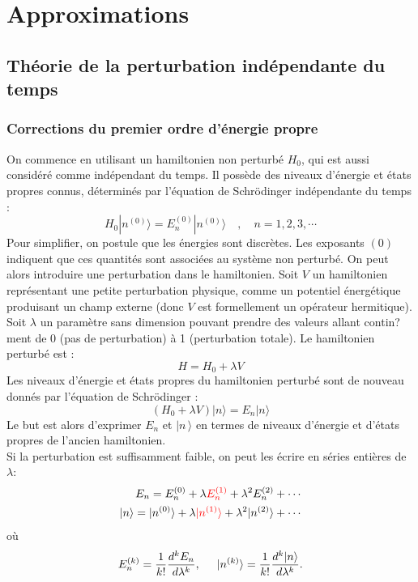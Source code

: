 \documentclass{article}
\begin{document}
\section{Approximations}
\subsection{Th\'eorie de la perturbation ind\'ependante du temps}
\subsubsection{Corrections du premier ordre d'\'energie propre}
On commence en utilisant un hamiltonien non perturb\'e $\scriptstyle H_0$, qui est aussi consid\'er\'e comme ind\'ependant du temps. Il poss\`ede des niveaux d'\'energie et \'etats propres connus, d\'etermin\'es par l'\'equation de Schr\"odinger ind\'ependante du temps :
$$
 H_0 |n^{(0)}\rangle = E_n^{(0)} |n^{(0)}\rangle \quad,\quad n = 1, 2, 3, \cdots
$$
Pour simplifier, on postule que les \'energies sont discr\`etes. Les exposants $\scriptstyle (0)$ indiquent que ces quantit\'es sont associ\'ees au syst\`eme non perturb\'e.
On peut alors introduire une perturbation dans le hamiltonien. Soit $\scriptstyle V$ un hamiltonien repr\'esentant une petite perturbation physique, comme un potentiel \'energ\'etique produisant un champ externe (donc $\scriptstyle V$ est formellement un op\'erateur hermitique). Soit $\scriptstyle \lambda$ un param\`etre sans dimension pouvant prendre des valeurs allant contin?ment de 0 (pas de perturbation) \`a 1 (perturbation totale). Le hamiltonien perturb\'e est :
$$
H = H_0 + \lambda V
$$
Les niveaux d'\'energie et \'etats propres du hamiltonien perturb\'e sont de nouveau donn\'es par l'\'equation de Schr\"odinger :
$$
 \left(H_0 + \lambda V \right) |n\rangle = E_n|n\rangle
$$
Le but est alors d'exprimer $\scriptstyle E_n$ et $\scriptstyle\mid n\,\rangle$  en termes de niveaux d'\'energie et d'\'etats propres de l'ancien hamiltonien.\\
Si la perturbation est suffisamment faible, on peut les \'ecrire en s\'eries enti\`eres de $\lambda$:
$$
\begin{aligned}
E_n = E_n^{(0)} + \lambda \red{E_n^{(1)}} + \lambda^2 E_n^{(2)} + \cdots \\
|n\rangle = |n^{(0)}\rangle + \lambda \red{|n^{(1)}\rangle} + \lambda^2 |n^{(2)}\rangle + \cdots
\end{aligned}
$$
o\`u
$$
 E_n^{(k)} = \frac{1}{k!} \frac{d^k E_n}{d \lambda^k} , \hspace{0.5cm}
 |n^{(k)}\rangle = \frac{1}{k!}\frac{d^k |n\rangle }{d \lambda^k}.
$$
\end{document}
